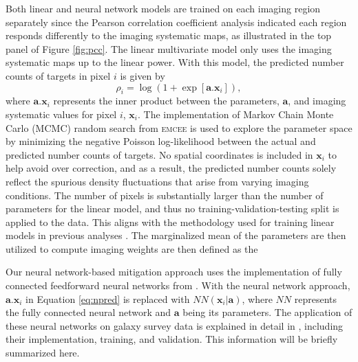 Both linear and neural network models are trained on each imaging region separately since the Pearson correlation coefficient analysis indicated each region responds differently to the imaging systematic maps, as illustrated in the top panel of Figure \ref{fig:pcc}. The linear multivariate model only uses the imaging systematic maps up to the linear power. With this model, the predicted number counts of targets in pixel $i$ is given by
\begin{equation}\label{eq:npred}
    \rho_{i} = \log ( 1 + \exp[\textbf{a}.\textbf{x}_{i}]),
\end{equation}
where $\textbf{a}.\textbf{x}_{i}$ represents the inner product between the parameters, $\textbf{a}$, and imaging systematic values for pixel $i$, $\textbf{x}_{i}$. The implementation of Markov Chain Monte Carlo (MCMC) random search from \textsc{emcee} \citep{2013PASP..125..306F} is used to explore the parameter space by minimizing the negative Poisson log-likelihood between the actual and predicted number counts of targets. No spatial coordinates is included in $\textbf{x}_{i}$ to help avoid over correction, and as a result, the predicted number counts solely reflect the spurious density fluctuations that arise from varying imaging conditions. The number of pixels is substantially larger than the number of parameters for the linear model, and thus no training-validation-testing split is applied to the data. This aligns with the methodology used for training linear models in previous analyses \citep[see, e.g.,][]{zhou2022target}. The marginalized mean of the parameters are then utilized to compute imaging weights are then defined as the

Our neural network-based mitigation approach uses the implementation of fully connected feedforward neural networks from \cite{rezaie2021primordial}. With the neural network approach, $\textbf{a}.\textbf{x}_{i}$ in Equation \ref{eq:npred} is replaced with $NN(\textbf{x}_{i}|\textbf{a})$, where $NN$ represents the fully connected neural network and $\textbf{a}$ being its parameters. The application of these neural networks on galaxy survey data is explained in detail in \cite{rezaie2021primordial}, including their implementation, training, and validation. This information will be briefly summarized here. 

